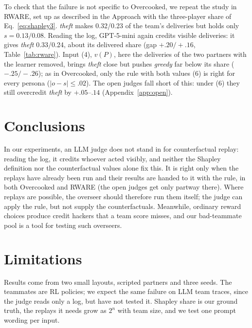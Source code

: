 \documentclass[letterpaper]{article} %
\begin{document}
To check that the failure is not specific to Overcooked, we repeat the study in RWARE, set up as described in the
Approach with the three-player share of Eq.~\eqref{eq:shapley3}. \emph{theft} makes 0.32/0.23 of the team's deliveries but holds only $s=0.13/0.08$.
Reading the log, GPT-5-mini again credits visible deliveries: it gives \emph{theft} 0.33/0.24, about its delivered
share (gap $+.20/+.16$, Table~\ref{tab:rware}). Input (4), $v(P)$, here the deliveries of the two
partners with the learner removed, brings \emph{theft} close but pushes \emph{greedy} far below its share
($-.25/-.26$); as in Overcooked, only the rule with both values (6) is right for every persona ($|o-s|\le .02$). The
open judges fall short of this: under (6) they still overcredit \emph{theft} by $+.05$--$.14$
(Appendix~\ref{app:open}).

\section{Conclusions}
In our experiments, an LLM judge does not stand in for counterfactual replay: reading the log, it credits whoever
acted visibly, and neither the Shapley definition nor the counterfactual values alone fix this. It is right only when
the replays have already been run and their results are handed to it with the rule, in both Overcooked and RWARE
(the open judges get only partway there). Where replays are possible, the overseer should therefore run them itself;
the judge can apply the rule, but not supply the counterfactuals. Meanwhile, ordinary reward choices produce credit hackers
that a team score misses, and our bad-teammate pool is a tool for testing such overseers.

\section{Limitations}
\label{sec:limits}
Results come from two small layouts, scripted partners and three seeds. The teammates are RL policies; we expect the
same failure on LLM team traces, since the judge reads only a log, but have not tested it. Shapley share is our ground
truth, the replays it needs grow as $2^n$ with team size, and we test one prompt wording per input.

\clearpage


\appendix
\onecolumn  %
\raggedbottom  %
\end{document}
